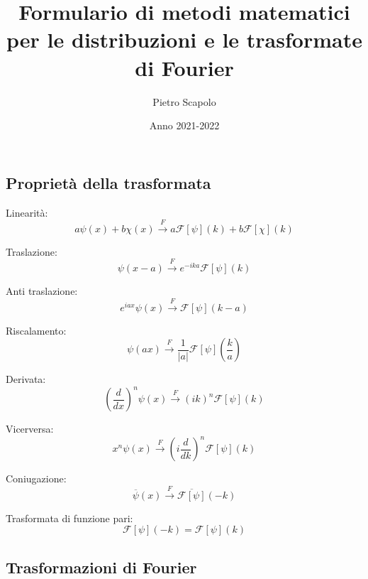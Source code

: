 \documentclass[a4paper, 11pt]{article}
\newcommand{\F}[0]{\overset{F}{\longrightarrow}}{}
\newcommand{\Ff}[0]{\mathcal{F}}{}
\begin{document}
\title{Formulario di metodi matematici per le distribuzioni e le trasformate di Fourier}
\author{Pietro Scapolo}
\date{Anno 2021-2022}
\maketitle

\hrulefill
\begin{centering}
\section{Proprietà della trasformata}
\end{centering}
\bigskip

Linearità:
\begin{equation}
    a \psi(x) + b \chi(x) \F a \Ff[\psi](k) + b \Ff[\chi](k)
\end{equation}
\bigskip

Traslazione:
\begin{equation}
    \psi (x- a) \F e^{-ika} \Ff [\psi](k)    
\end{equation}
\bigskip

Anti traslazione:
\begin{equation}
    e^{iax} \psi(x) \F  \Ff[\psi](k-a)
\end{equation}
\bigskip

Riscalamento:
\begin{equation}
    \psi (ax) \F \frac{1}{|a|} \Ff [\psi]\left(\frac{k}{a}\right)
\end{equation}
\bigskip

Derivata:
\begin{equation}
    \left( \frac{d}{dx} \right)^n \psi (x) \F (ik)^n \Ff [\psi] (k)
\end{equation}
\bigskip

Vicerversa:
\begin{equation}
    x^n \psi(x) \F \left(i \frac{d}{dk} \right)^n \Ff [\psi](k)
\end{equation}
\bigskip

Coniugazione:
\begin{equation}
    \overline{\psi}(x) \F \overline{\Ff[\psi]}(-k)
\end{equation}
\bigskip

Trasformata di funzione pari:
\begin{equation}
   \Ff[\psi](-k) = \Ff[\psi](k)
\end{equation}

\newpage
\hrulefill
\begin{center}
\section{Trasformazioni di Fourier}
\end{center}
\end{document}

